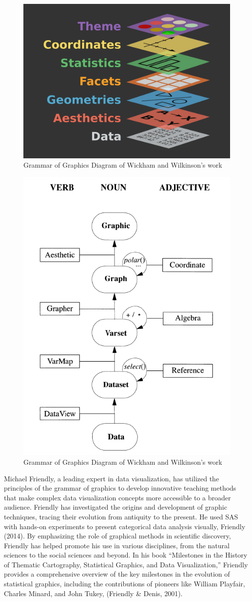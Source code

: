 \documentclass[print]{nuthesis}
\begin{document}
\begin{figure}

{\centering \includegraphics[width=0.45\linewidth]{figure/gglayers} 

}

\caption{Grammar of Graphics Diagram of Wickham and Wilkinson's work}\label{fig:graphics2-1}
\end{figure}
\begin{figure}

{\centering \includegraphics[width=0.45\linewidth]{figure/graphic-flowchart} 

}

\caption{Grammar of Graphics Diagram of Wickham and Wilkinson's work}\label{fig:graphics2-2}
\end{figure}

Michael Friendly, a leading expert in data visualization, has utilized the principles of the grammar of graphics to develop innovative teaching methods that make complex data visualization concepts more accessible to a broader audience.
Friendly has investigated the origins and development of graphic techniques, tracing their evolution from antiquity to the present.
He used SAS with hands-on experiments to present categorical data analysis visually, Friendly (2014).
By emphasizing the role of graphical methods in scientific discovery, Friendly has helped promote his use in various disciplines, from the natural sciences to the social sciences and beyond.
In his book ``Milestones in the History of Thematic Cartography, Statistical Graphics, and Data Visualization,'' Friendly provides a comprehensive overview of the key milestones in the evolution of statistical graphics, including the contributions of pioneers like William Playfair, Charles Minard, and John Tukey, (Friendly \& Denis, 2001).
\end{document}
